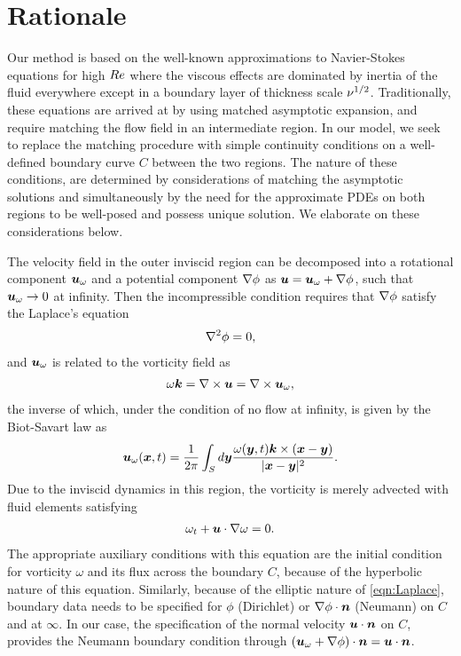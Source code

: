 \section{Rationale}

Our method is based on the well-known approximations to Navier-Stokes equations for high $Re$ where the viscous effects are dominated by inertia of the fluid everywhere except in a boundary layer of thickness scale $\nu^{1/2}$. 
Traditionally, these equations are arrived at by using matched asymptotic expansion, and require matching the flow field in an intermediate region.
In our model, we seek to replace the matching procedure with simple continuity conditions on a well-defined boundary curve $C$ between the two regions.
The nature of these conditions, are determined by considerations of matching the asymptotic solutions and simultaneously by the need for the approximate PDEs on both regions to be well-posed and possess unique solution.
We elaborate on these considerations below.

The velocity field in the outer inviscid region can be decomposed into a rotational component $\boldsymbol{u}_{\omega}$ and a potential component $\nabla \phi$ as $\boldsymbol{u} = \boldsymbol{u}_{\omega} + \nabla \phi$, such that $\boldsymbol{u}_\omega\to 0$ at infinity.
Then the incompressible condition requires that $\nabla \phi$ satisfy the Laplace's equation
\begin{align}
\label{eqn:Laplace}
\nabla^2 \phi = 0,
\end{align}
and $\boldsymbol{u}_\omega$ is related to the vorticity field as
\begin{align}
\omega \boldsymbol{k} = \nabla \times \boldsymbol{u} = \nabla \times \boldsymbol{u}_{\omega},
\end{align}
the inverse of which, under the condition of no flow at infinity, is given by the Biot-Savart law as
\begin{align}
\label{eqn:Biot-Savart}
\boldsymbol{u}_{\omega} (\boldsymbol{x}, t) =  \frac{1}{2\pi} \int_{S} d\boldsymbol{y} \frac{\omega(\boldsymbol{y}, t)\boldsymbol{k} \times (\boldsymbol{x} - \boldsymbol{y})}{|\boldsymbol{x} - \boldsymbol{y}|^2}.
\end{align}
Due to the inviscid dynamics in this region, the vorticity is merely advected with fluid elements satisfying
\begin{align}
 \omega_t + \boldsymbol{u}\cdot\nabla\omega = 0. \label{eqn:Vorticity}
\end{align}
The appropriate auxiliary conditions with this equation are the initial condition for vorticity $\omega$ and its flux across the boundary $C$, because of the hyperbolic nature of this equation. 
Similarly, because of the elliptic nature of \eqref{eqn:Laplace}, boundary data needs to be specified for $\phi$ (Dirichlet) or $\nabla \phi \cdot \boldsymbol{n}$ (Neumann) on $C$ and at $\infty$.
In our case, the specification of the normal velocity $\boldsymbol{u} \cdot \boldsymbol{n}$ on $C$, provides the Neumann boundary condition through $(\boldsymbol{u}_\omega + \nabla \phi) \cdot \boldsymbol{n} = \boldsymbol{u} \cdot \boldsymbol{n}$.

